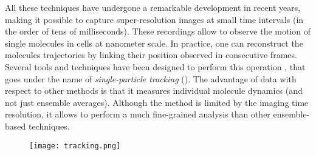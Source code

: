 All these techniques have undergone a remarkable development in recent years, making it possible to capture super-resolution images at small time intervals (in the order of tens of milliseconds). These recordings allow to observe the motion of single molecules in cells at nanometer scale. In practice, one can reconstruct the molecules trajectories by linking their position observed in consecutive frames. Several tools and techniques have been designed to perform this operation , that goes under the name of \emph{single-particle tracking} (). The advantage of  data with respect to other methods is that it measures individual molecule dynamics (and not just ensemble averages). Although the method is limited by the imaging time resolution, it allows to perform a much fine-grained analysis than other ensemble-based techniques.

\begin{figure}
  \label{fig:tracking}
  \texttt{[image: tracking.png]}
\end{figure}
